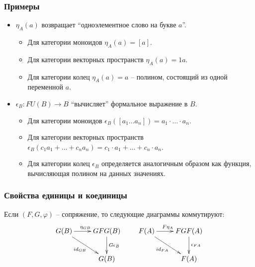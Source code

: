 \documentclass{beamer}
\theoremstyle{definition}
\begin{document}
\begin{frame}
\frametitle{Примеры}
\begin{itemize}
\item $\eta_A(a)$ возвращает ``одноэлементное слово на букве $a$''.
\begin{itemize}
\item Для категории моноидов $\eta_A(a) = [a]$.
\item Для категории векторных пространств $\eta_A(a) = 1 a$.
\item Для категории колец $\eta_A(a) = a$ -- полином, состоящий из одной переменной $a$.
\end{itemize}

\item $\epsilon_B : FU(B) \to B$ ``вычисляет'' формальное выражение в $B$.
\begin{itemize}
\item Для категории моноидов $\epsilon_B([a_1 \ldots a_n]) = a_1 \cdot \ldots \cdot a_n$.
\item Для категории векторных пространств $\epsilon_B(c_1 a_1 + \ldots + c_n a_n) = c_1 \cdot a_1 + \ldots + c_n \cdot a_n$.
\item Для категории колец $\epsilon_B$ определяется аналогичным образом как функция, вычисляющая полином на данных значениях.
\end{itemize}
\end{itemize}
\end{frame}

\begin{frame}
\frametitle{Свойства единицы и коединицы}
\begin{prop}
Если $(F,G,\varphi)$ -- сопряжение, то следующие диаграммы коммутируют:
\[ \xymatrix{ G(B) \ar[r]^{\eta_{GB}} \ar[rd]_{id_{GB}} & GFG(B) \ar[d]^{G\epsilon_B} \\
                                                        & G(B)
            }
\qquad
   \xymatrix{ F(A) \ar[r]^{F\eta_A} \ar[rd]_{id_{FA}} & FGF(A) \ar[d]^{\epsilon_{FA}} \\
                                                      & F(A)
            } \]
\end{prop}
\end{frame}
\end{document}
